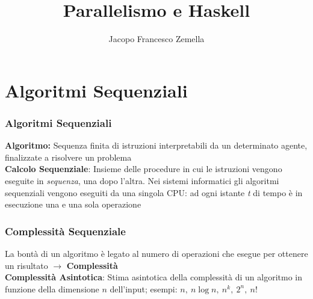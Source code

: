 \documentclass[14pt]{beamer}
\title[Parallelismo e Haskell]{Parallelismo e Haskell} %
\author{Jacopo Francesco Zemella} %
\institute[Unimi] %
{
Universit\`a degli studi di Milano \\[2ex] %
\medskip
\textit{jacopofrancesco.zemella@studenti.unimi.it} %
}
\begin{document}
\begin{frame}
\titlepage %
\end{frame}



\section{Algoritmi Sequenziali} %


\begin{frame}
\frametitle{Algoritmi Sequenziali}
\textbf{Algoritmo:} Sequenza finita di istruzioni interpretabili da un determinato agente, finalizzate a risolvere un problema\\[2ex]
\textbf{Calcolo Sequenziale}: Insieme delle procedure in cui le istruzioni vengono eseguite in \textit{sequenza}, una dopo l'altra. Nei sistemi informatici gli algoritmi sequenziali vengono eseguiti da una singola CPU: ad ogni istante \textit{t} di tempo è in esecuzione una e una sola operazione
\end{frame}


\begin{frame}
\frametitle{Complessità Sequenziale}
La bontà di un algoritmo è legato al numero di operazioni che esegue per ottenere un risultato $\rightarrow$ \textbf{Complessità}\\[2ex]
\textbf{Complessità Asintotica}: Stima asintotica della complessità di un algoritmo in funzione della dimensione $n$ dell'input; esempi: $n, \ n\log n, \ n^k, \ 2^n, \ n!$
\end{frame}
\end{document}
